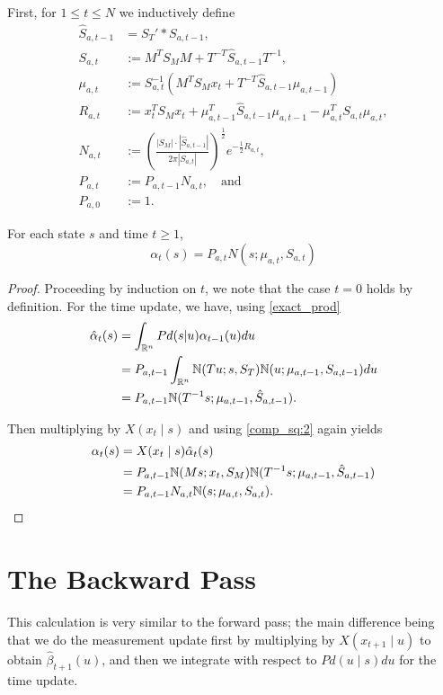\documentclass[12pt,leqno]{article}
\begin{document}
  First, for $1\le t \le N$ we inductively define
  \begin{align*}
    \hat{S}_{a,t-1} &= S_T'*S_{a,t-1},\\
    S_{a,t} &:= M^TS_MM  +T^{-T} \hat{S}_{a,t-1}T^{-1},\\
    \mu_{a,t} &:= S_{a,t}^{-1}(M^TS_Mx_t + T^{-T}\hat{S}_{a,t-1}\mu_{a,t-1})\\
    R_{a,t} &:= x_t^TS_Mx_t + \mu_{a,t-1}^T\hat{S}_{a,t-1}\mu_{a,t-1} - \mu_{a,t}^TS_{a,t}\mu_{a,t},\\
    N_{a,t} &:= \left(\frac{|S_M|\cdot|\hat{S}_{a,t-1}|}{2\pi|S_{a,t}|}\right)^{\frac{1}{2}}e^{-\frac{1}{2}R_{a,t}},\\
    P_{a,t} &:= P_{a,t-1}N_{a,t}, \quad\text{and}\\
    P_{a,0} &:= 1.
  \end{align*}

\begin{Thm}\label{alpha:1}
  For each state $s$ and time $t \ge 1$,
$$
  \alpha_t(s) = P_{a,t}N(s;\mu_{a,t},S_{a,t})
$$
\end{Thm}

\begin{proof}

Proceeding by induction on $t$, we note that the case $t = 0$ holds by definition.
For the time update, we have, using \eqref{exact_prod}
\begin{align}
  \hat{\alpha}_t(s) &= \int_{{\mathbb R}^n}Pd(s|u)\alpha_{t-1}(u)du \\\notag
  &= P_{a,t-1}\int_{{\mathbb R}^n}{\mathbb N}(Tu;s,S_T){\mathbb N}(u;\mu_{a,t-1},S_{a,t-1})du \notag\\
  &= P_{a,t-1}{\mathbb N}(T^{-1}s;\mu_{a,t-1},\hat{S}_{a,t-1}).
\end{align}

Then multiplying by $X(x_t\mid s)$ and using \eqref{comp_sq:2} again yields
\begin{align*}
  \alpha_t(s) &= X(x_t\mid s)\hat{\alpha}_t(s) \\
  &= P_{a,t-1}{\mathbb N}(Ms;x_t,S_M){\mathbb N}(T^{-1}s;\mu_{a,t-1},\hat{S}_{a,t-1}) \\
  &= P_{a,t-1}N_{a,t}{\mathbb N}(s;\mu_{a,t},S_{a,t}).
\end{align*}
\end{proof}

\section{The Backward Pass}
This calculation is very similar to the forward pass; the main difference being that we do
the measurement update first by multiplying by $X(x_{t+1}\mid u)$ to obtain $\hat{\beta}_{t+1}(u)$,
and then we integrate with respect to $Pd(u\mid s)du$ for the time update.  
\end{document}
